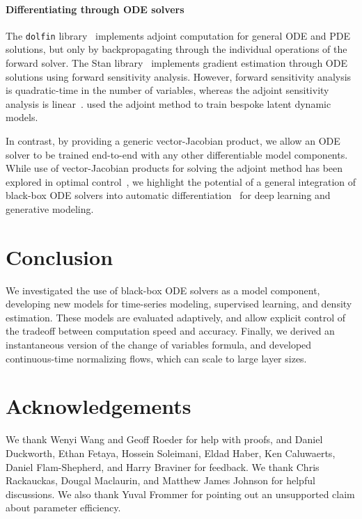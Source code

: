 \documentclass{article}
\begin{document}
\paragraph{Differentiating through ODE solvers}
The \texttt{dolfin} library~\citep{dolfin2013} implements adjoint computation for general ODE and PDE solutions, but only by backpropagating through the individual operations of the forward solver.
The Stan library~\citep{carpenter2015stan} implements gradient estimation through ODE solutions using forward sensitivity analysis.
However, forward sensitivity analysis is quadratic-time in the number of variables, whereas the adjoint sensitivity analysis is linear~\citep{carpenter2015stan,zhang2014fatode}.
\citet{melicher2017fast} used the adjoint method to train bespoke latent dynamic models.

In contrast, by providing a generic vector-Jacobian product, we allow an ODE solver to be trained end-to-end with any other differentiable model components. While use of vector-Jacobian products for solving the adjoint method has been explored in optimal control~\citep{andersson2013general,Andersson2018}, we highlight the potential of a general integration of black-box ODE solvers into automatic differentiation~\citep{baydin2017automatic} for deep learning and generative modeling.


\section{Conclusion}

We investigated the use of black-box ODE solvers as a model component, developing new models for time-series modeling, supervised learning, and density estimation.
These models are evaluated adaptively, and allow explicit control of the tradeoff between computation speed and accuracy.
Finally, we derived an instantaneous version of the change of variables formula, and developed continuous-time normalizing flows, which can scale to large layer sizes.

\section{Acknowledgements}
We thank Wenyi Wang and Geoff Roeder for help with proofs, and Daniel Duckworth, Ethan Fetaya, Hossein Soleimani, Eldad Haber, Ken Caluwaerts, Daniel Flam-Shepherd, and Harry Braviner for feedback. We thank Chris Rackauckas, Dougal Maclaurin, and Matthew James Johnson for helpful discussions.
We also thank Yuval Frommer for pointing out an unsupported claim about parameter efficiency.
\end{document}
